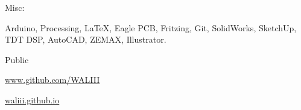\halfblankline

Misc:
%
\begin{innerlist}
    \item Arduino, Processing, \LaTeX, Eagle PCB, Fritzing, Git, SolidWorks, SketchUp, TDT DSP, AutoCAD, ZEMAX, Illustrator.
\end{innerlist}

\halfblankline

Public

%
\begin{innerlist}
    \item \href{http://www.github.com/WALIII} {www.github.com/WALIII}  
    \item \href{http://waliii.github.io} {waliii.github.io}
        \end{innerlist}




